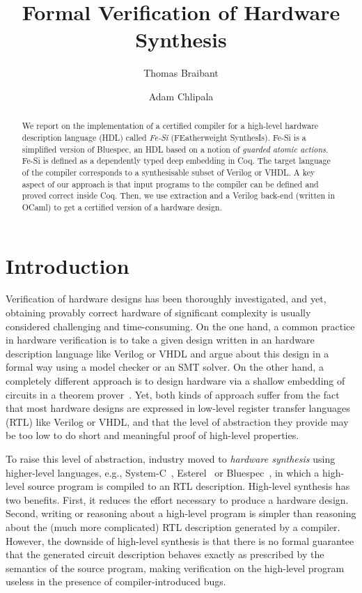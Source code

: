 \documentclass{llncs}
\author{Thomas Braibant \and Adam Chlipala}
\institute{}
\title{Formal Verification of Hardware Synthesis}
\begin{document}
\maketitle

\begin{abstract}
  We report on the implementation of a certified compiler for a
  high-level hardware description language (HDL) called \emph{Fe-Si}
  (FEatherweight SynthesIs).
  Fe-Si is a simplified version of Bluespec, an HDL based on a notion
  of \emph{guarded atomic actions}. Fe-Si is defined as a
  dependently typed deep embedding in Coq. The target language of the
  compiler corresponds to a synthesisable subset of Verilog or VHDL.
  A key aspect of our approach is that input programs to the compiler
  can be defined and proved correct inside Coq. Then, we use
  extraction and a Verilog back-end (written in OCaml) to get a
  certified version of a hardware design.
\end{abstract}

\section*{Introduction}
Verification of hardware designs has been thoroughly investigated, and
yet, obtaining provably correct hardware of significant complexity is
usually considered challenging and time-consuming. 
%
On the one hand, a common practice in hardware verification is to take
a given design written in an hardware description language like
Verilog or VHDL and argue about this design in a formal way using a
model checker or an SMT solver.
%
On the other hand, a completely different approach is to design
hardware via a shallow embedding of circuits in a theorem
prover~\cite{hanna-veritas,UCAM-CL-TR-77,hunt89,vamp,certifying-circuits-in-type-theory}.
%
Yet, both kinds of approach suffer from the fact that most hardware
designs are expressed in low-level register transfer languages (RTL)
like Verilog or VHDL, and that the level of abstraction they provide
may be too low to do short and meaningful proof of high-level
properties.

\medskip

To raise this level of abstraction, industry moved to \emph{hardware
  synthesis} using higher-level languages, e.g., System-C~\cite{systemc},
Esterel~\cite{DBLP:conf/birthday/Berry00} or Bluespec~\cite{bluespec},
in which a high-level source program is compiled to an RTL
description.
%
High-level synthesis has two benefits. 
%
First, it reduces the effort necessary to produce a hardware design.
%
Second, writing or reasoning about a high-level program is simpler
than reasoning about the (much more complicated) RTL description
generated by a compiler.
%
However, the downside of high-level synthesis is that there is no
formal guarantee that the generated circuit description behaves
exactly as prescribed by the semantics of the source
program, making verification on the high-level program useless in the
presence of compiler-introduced bugs.
%
\end{document}
